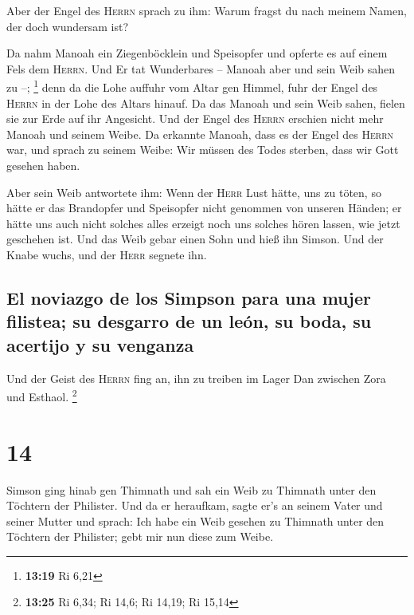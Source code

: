  Aber der Engel des \textsc{Herrn} sprach zu ihm: Warum
fragst du nach meinem Namen, der doch wundersam ist?

 Da nahm Manoah ein Ziegenböcklein und Speisopfer und
opferte es auf einem Fels dem \textsc{Herrn}. Und Er tat Wunderbares --
Manoah aber und sein Weib sahen zu --; \footnote{\textbf{13:19} Ri 6,21}
 denn da die Lohe auffuhr vom Altar gen Himmel, fuhr der
Engel des \textsc{Herrn} in der Lohe des Altars hinauf. Da das Manoah
und sein Weib sahen, fielen sie zur Erde auf ihr Angesicht.
 Und der Engel des \textsc{Herrn} erschien nicht mehr
Manoah und seinem Weibe. Da erkannte Manoah, dass es der Engel des
\textsc{Herrn} war,  und sprach zu seinem Weibe: Wir
müssen des Todes sterben, dass wir Gott gesehen haben.

 Aber sein Weib antwortete ihm: Wenn der \textsc{Herr}
Lust hätte, uns zu töten, so hätte er das Brandopfer und Speisopfer
nicht genommen von unseren Händen; er hätte uns auch nicht solches alles
erzeigt noch uns solches hören lassen, wie jetzt geschehen ist.
 Und das Weib gebar einen Sohn und hieß ihn Simson. Und
der Knabe wuchs, und der \textsc{Herr} segnete ihn.

\hypertarget{el-noviazgo-de-los-simpson-para-una-mujer-filistea-su-desgarro-de-un-leuxf3n-su-boda-su-acertijo-y-su-venganza}{%
\subsection{El noviazgo de los Simpson para una mujer filistea; su
desgarro de un león, su boda, su acertijo y su
venganza}\label{el-noviazgo-de-los-simpson-para-una-mujer-filistea-su-desgarro-de-un-leuxf3n-su-boda-su-acertijo-y-su-venganza}}

 Und der Geist des \textsc{Herrn} fing an, ihn zu treiben
im Lager Dan zwischen Zora und Esthaol. \footnote{\textbf{13:25} Ri
  6,34; Ri 14,6; Ri 14,19; Ri 15,14}

\hypertarget{section-13}{%
\section{14}\label{section-13}}

 Simson ging hinab gen Thimnath und sah ein Weib zu
Thimnath unter den Töchtern der Philister.  Und da er
heraufkam, sagte er's an seinem Vater und seiner Mutter und sprach: Ich
habe ein Weib gesehen zu Thimnath unter den Töchtern der Philister; gebt
mir nun diese zum Weibe.

